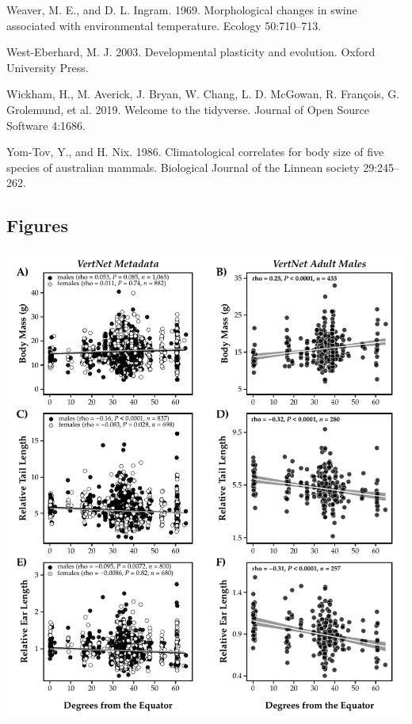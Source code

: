 \documentclass[]{article}
\begin{document}
\leavevmode\hypertarget{ref-Weaver1969}{}%
Weaver, M. E., and D. L. Ingram. 1969. Morphological changes in swine
associated with environmental temperature. Ecology 50:710--713.

\leavevmode\hypertarget{ref-West-Eberhard2003}{}%
West-Eberhard, M. J. 2003. Developmental plasticity and evolution.
Oxford University Press.

\leavevmode\hypertarget{ref-Wickham2019}{}%
Wickham, H., M. Averick, J. Bryan, W. Chang, L. D. McGowan, R. François,
G. Grolemund, et al. 2019. Welcome to the tidyverse. Journal of Open
Source Software 4:1686.

\leavevmode\hypertarget{ref-Yom-Tov1986}{}%
Yom-Tov, Y., and H. Nix. 1986. Climatological correlates for body size
of five species of australian mammals. Biological Journal of the Linnean
society 29:245--262.

\setlength{\parindent}{0in}
\setlength{\leftskip}{0in}

\newpage

\hypertarget{figures}{%
\subsection{Figures}\label{figures}}

\includegraphics{../results/figures/VertNet_relative.pdf}
\end{document}
